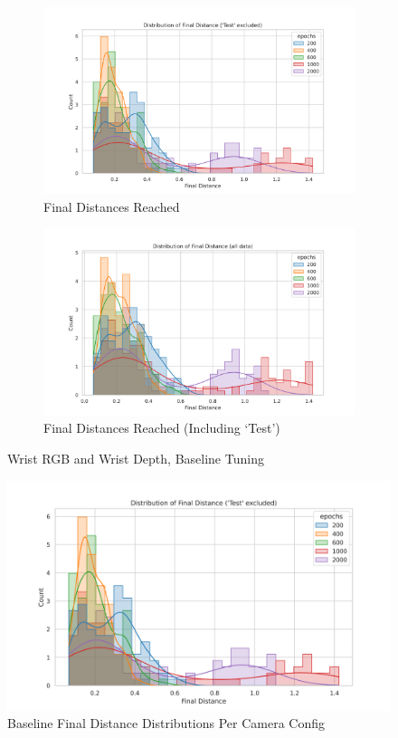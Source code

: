 \begin{figure}[H]
  \centering
  \begin{subfigure}{0.45\linewidth}
    \centering
    \includegraphics[width=\linewidth]{assets/evaluation/rnn/wd-epoch-test-final.png}
    \caption{Final Distances Reached}\label{subfig:rnn-grasp-final}
  \end{subfigure}

  \begin{subfigure}{0.45\linewidth}
    \centering
    \includegraphics[width=\linewidth]{assets/evaluation/rnn/wdw-epoch-test-all-final.png}
    \caption{Final Distances Reached (Including `Test')}\label{subfig:rnn-grasp-final}
  \end{subfigure}
  \caption{Wrist RGB and Wrist Depth, Baseline Tuning}\label{fig:}
\end{figure}

\begin{figure}[H]
  \centering
  \includegraphics{assets/evaluation/rnn/wd-epoch-test-final.png}
  \caption{Baseline Final Distance Distributions Per Camera Config }\label{fig:rnn-grasp-tuning}
\end{figure}